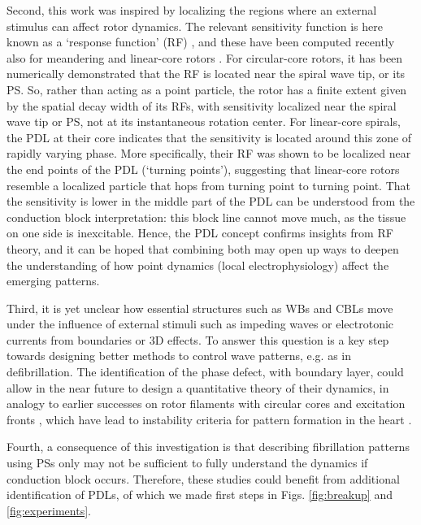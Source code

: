 \documentclass{article}
\begin{document}
Second, this work was inspired by localizing the regions where an external stimulus can affect rotor dynamics. The relevant sensitivity function is here known as a `response function' (RF) \citep{Biktasheva:2003}, and these have been computed recently also for meandering and linear-core rotors \citep{Marcotte:2015, Dierckx:2017}. 
For circular-core rotors, it has been numerically demonstrated that the RF is located near the spiral wave tip, or its PS. So, rather than acting as a point particle, the rotor has a finite extent given by the spatial decay width of its RFs, with sensitivity localized near the spiral wave tip or PS, not at its instantaneous rotation center. 
For linear-core spirals, the PDL at their core indicates that the sensitivity is located around this zone of rapidly varying phase. More specifically, their RF was shown to be localized near the end points of the PDL \citep{Dierckx:2017} (`turning points'), suggesting that linear-core rotors resemble a localized particle that hops from turning point to turning point. That the sensitivity is lower in the middle part of the PDL can be understood from the conduction block interpretation: this block line cannot move much, as the tissue on one side is inexcitable. Hence, the PDL concept confirms insights from RF theory, and it can be hoped that combining both may open up ways to deepen the understanding of how point dynamics (local electrophysiology) affect the emerging patterns. 

Third, it is yet unclear how essential structures such as WBs and CBLs move under the influence of external stimuli such as impeding waves or electrotonic currents from boundaries or 3D effects. To answer this question is a key step towards designing better methods to control wave patterns, e.g. as in defibrillation. The identification of the phase defect, with boundary layer, could allow in the near future to design a quantitative theory of their dynamics, in analogy to earlier successes on rotor filaments with circular cores \citep{Keener:1988} and excitation fronts \citep{Kuramoto:1980}, which have lead to instability criteria for pattern formation in the heart \citep{Biktashev:1994, Dierckx:2012}. 

Fourth, a consequence of this investigation is that describing fibrillation patterns using PSs only \citep{Gray:1995,Gurevich:2019} may not be sufficient to fully understand the dynamics if conduction block occurs. Therefore, these studies could benefit from additional identification of PDLs, of which we made first steps in Figs. \ref{fig:breakup} and \ref{fig:experiments}. 
\end{document}
